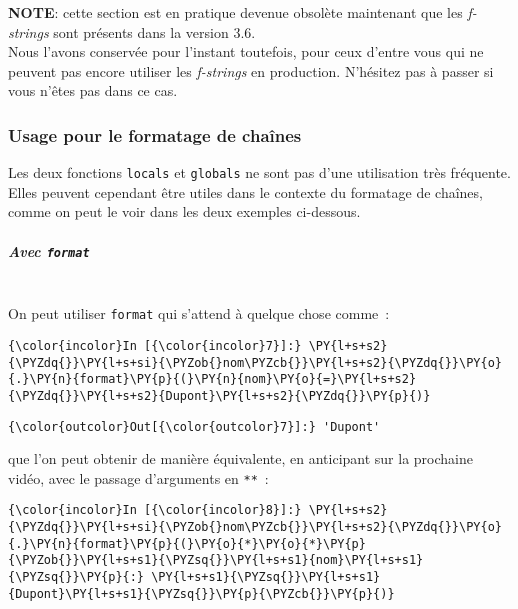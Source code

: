     \textbf{NOTE}: cette section est en pratique devenue obsolète maintenant
que les \emph{f-strings} sont présents dans la version 3.6.\\

Nous l'avons conservée pour l'instant toutefois, pour ceux d'entre vous
qui ne peuvent pas encore utiliser les \emph{f-strings} en production.
N'hésitez pas à passer si vous n'êtes pas dans ce cas.

    \hypertarget{usage-pour-le-formatage-de-chauxeenes}{%
\subsubsection{Usage pour le formatage de
chaînes}\label{usage-pour-le-formatage-de-chauxeenes}}

    Les deux fonctions \texttt{locals} et \texttt{globals} ne sont pas d'une
utilisation très fréquente. Elles peuvent cependant être utiles dans le
contexte du formatage de chaînes, comme on peut le voir dans les deux
exemples ci-dessous.

    \hypertarget{avec-format}{%
\subparagraph{\texorpdfstring{Avec
\texttt{format}}{Avec format}\\\\}\label{avec-format}}

    On peut utiliser \texttt{format} qui s'attend à quelque chose comme~:

    \begin{Verbatim}[commandchars=\\\{\}]
{\color{incolor}In [{\color{incolor}7}]:} \PY{l+s+s2}{\PYZdq{}}\PY{l+s+si}{\PYZob{}nom\PYZcb{}}\PY{l+s+s2}{\PYZdq{}}\PY{o}{.}\PY{n}{format}\PY{p}{(}\PY{n}{nom}\PY{o}{=}\PY{l+s+s2}{\PYZdq{}}\PY{l+s+s2}{Dupont}\PY{l+s+s2}{\PYZdq{}}\PY{p}{)}
\end{Verbatim}


\begin{Verbatim}[commandchars=\\\{\}]
{\color{outcolor}Out[{\color{outcolor}7}]:} 'Dupont'
\end{Verbatim}
            
    que l'on peut obtenir de manière équivalente, en anticipant sur la
prochaine vidéo, avec le passage d'arguments en \texttt{**}~:

    \begin{Verbatim}[commandchars=\\\{\}]
{\color{incolor}In [{\color{incolor}8}]:} \PY{l+s+s2}{\PYZdq{}}\PY{l+s+si}{\PYZob{}nom\PYZcb{}}\PY{l+s+s2}{\PYZdq{}}\PY{o}{.}\PY{n}{format}\PY{p}{(}\PY{o}{*}\PY{o}{*}\PY{p}{\PYZob{}}\PY{l+s+s1}{\PYZsq{}}\PY{l+s+s1}{nom}\PY{l+s+s1}{\PYZsq{}}\PY{p}{:} \PY{l+s+s1}{\PYZsq{}}\PY{l+s+s1}{Dupont}\PY{l+s+s1}{\PYZsq{}}\PY{p}{\PYZcb{}}\PY{p}{)}
\end{Verbatim}


